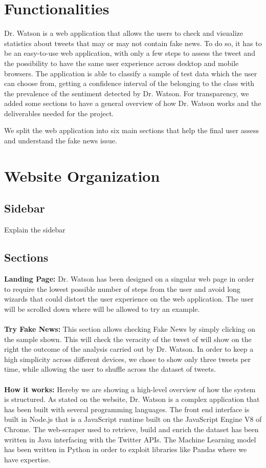 \section{Functionalities} 
Dr. Watson is a web application that allows the users to check and visualize statistics about tweets that may or may not contain fake news. To do so, it has to be an easy-to-use web application, with only a few steps to assess the tweet and the possibility to have the same user experience across desktop and mobile browsers. 
The application is able to classify a sample of test data which the user can choose from, getting a confidence interval of the belonging to the class with the prevalence of the sentiment detected by Dr. Watson.
For transparency, we added some sections to have a general overview of how Dr. Watson works and the deliverables needed for the project.

We split the web application into six main sections that help the final user assess and understand the fake news issue.

\section{Website Organization}
\subsection{Sidebar}
Explain the sidebar
\subsection{Sections}
\textbf{Landing Page:} 
Dr. Watson has been designed on a singular web page in order to require the lowest possible number of steps from the user and avoid long wizards that could distort the user experience on the web application.
The user will be scrolled down where will be allowed to try an example.\\~\\

\textbf{Try Fake News:}
This section allows checking Fake News by simply clicking on the sample shown. This will check the veracity of the tweet of will show on the right the outcome of the analysis carried out by Dr. Watson.
In order to keep a high simplicity across different devices, we chose to show only three tweets per time, while allowing the user to shuffle across the dataset of tweets. \\~\\

\textbf{How it works:}
Hereby we are showing a high-level overview of how the system is structured. 
As stated on the website, Dr. Watson is a complex application that has been built with several programming languages. 
The front end interface is built in Node.js that is a JavaScript runtime built on the JavaScript Engine V8 of Chrome.
The web-scraper used to retrieve, build and enrich the dataset has been written in Java interfacing with the Twitter APIs.
The Machine Learning model has been written in Python in order to exploit libraries like Pandas where we have expertise.\\~\\


